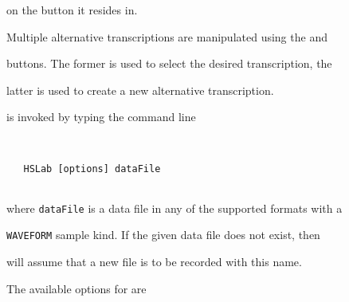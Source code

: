 on the button it resides in. 


Multiple alternative transcriptions are manipulated using the  and 


 buttons. The former is used to select the desired transcription, the 


latter is used to create a new alternative transcription.















 is invoked by typing the command line


\begin{verbatim}


   HSLab [options] dataFile


\end{verbatim}


where \texttt{dataFile} is a data file in any of the supported formats with a 


\texttt{WAVEFORM} sample kind.   If the given data file does not exist, then


 will assume that a new file is to be recorded with this name.





The available options for  are





